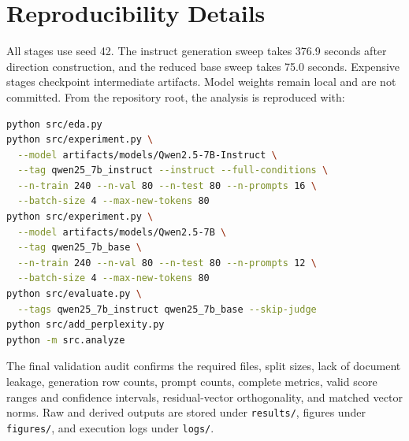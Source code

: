 \section{Reproducibility Details}
\label{app:reproducibility}

All stages use seed 42. The instruct generation sweep takes 376.9 seconds after direction construction, and the reduced base sweep takes 75.0 seconds. Expensive stages checkpoint intermediate artifacts. Model weights remain local and are not committed. From the repository root, the analysis is reproduced with:

\begin{lstlisting}[language=bash]
python src/eda.py
python src/experiment.py \
  --model artifacts/models/Qwen2.5-7B-Instruct \
  --tag qwen25_7b_instruct --instruct --full-conditions \
  --n-train 240 --n-val 80 --n-test 80 --n-prompts 16 \
  --batch-size 4 --max-new-tokens 80
python src/experiment.py \
  --model artifacts/models/Qwen2.5-7B \
  --tag qwen25_7b_base \
  --n-train 240 --n-val 80 --n-test 80 --n-prompts 12 \
  --batch-size 4 --max-new-tokens 80
python src/evaluate.py \
  --tags qwen25_7b_instruct qwen25_7b_base --skip-judge
python src/add_perplexity.py
python -m src.analyze
\end{lstlisting}

The final validation audit confirms the required files, split sizes, lack of document leakage, generation row counts, prompt counts, complete metrics, valid score ranges and confidence intervals, residual-vector orthogonality, and matched vector norms. Raw and derived outputs are stored under \texttt{results/}, figures under \texttt{figures/}, and execution logs under \texttt{logs/}.

